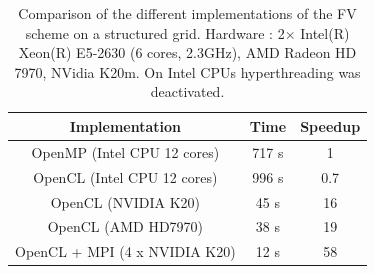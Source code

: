 \documentclass[preprint]{sig-alternate}
\begin{document}
%
%
%
%
\begin{table}
\begin{tabular}{|c|c|c|}
\hline
Implementation & Time & Speedup\tabularnewline
\hline
\hline
OpenMP (Intel CPU 12 cores) & 717 s & 1\tabularnewline
\hline
OpenCL (Intel CPU 12 cores) & 996 s & 0.7\tabularnewline
\hline
OpenCL (NVIDIA K20) & 45 s & 16\tabularnewline
\hline
OpenCL (AMD HD7970) & 38 s & 19\tabularnewline
\hline
OpenCL + MPI (4 x NVIDIA K20) & 12 s & 58\tabularnewline
\hline
\end{tabular}
 \caption{Comparison of the different implementations of the FV scheme on a
   structured grid. Hardware : 2$\times$  Intel(R) Xeon(R) E5-2630 (6 cores, 2.3GHz), AMD
   Radeon HD 7970, NVidia K20m. On Intel CPUs hyperthreading was deactivated. \label{fv-speedup}}
\end{table}
\end{document}
